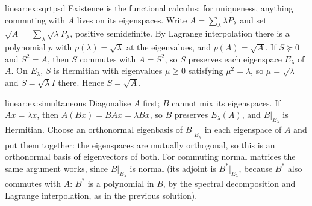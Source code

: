 \begin{solution}{linear:ex:sqrtpsd}
\idea Existence is the functional calculus; for uniqueness, anything commuting with $A$ lives on its eigenspaces.
\writeup Write $A=\sum_\lambda\lambda P_\lambda$ and set $\sqrt A=\sum_\lambda\sqrt\lambda P_\lambda$, positive semidefinite.
By Lagrange interpolation there is a polynomial $p$ with $p(\lambda)=\sqrt\lambda$ at the eigenvalues, and $p(A)=\sqrt A$.
If $S\succeq0$ and $S^2=A$, then $S$ commutes with $A=S^2$, so $S$ preserves each eigenspace $E_\lambda$ of $A$. On
$E_\lambda$, $S$ is Hermitian with eigenvalues $\mu\ge0$ satisfying $\mu^2=\lambda$, so $\mu=\sqrt\lambda$ and $S=\sqrt\lambda I$
there. Hence $S=\sqrt A$.
\end{solution}

\begin{solution}{linear:ex:simultaneous}
\idea Diagonalise $A$ first; $B$ cannot mix its eigenspaces.
\writeup If $Ax=\lambda x$, then $A(Bx)=BAx=\lambda Bx$, so $B$ preserves $E_\lambda(A)$, and $B|_{E_\lambda}$ is Hermitian.
Choose an orthonormal eigenbasis of $B|_{E_\lambda}$ in each eigenspace of $A$ and put them together: the eigenspaces are
mutually orthogonal, so this is an orthonormal basis of eigenvectors of both. For commuting normal matrices the same
argument works, since $B|_{E_\lambda}$ is normal (its adjoint is $B^*|_{E_\lambda}$, because $B^*$ also commutes with $A$:
$B^*$ is a polynomial in $B$, by the spectral decomposition and Lagrange interpolation, as in the previous solution).
\end{solution}

